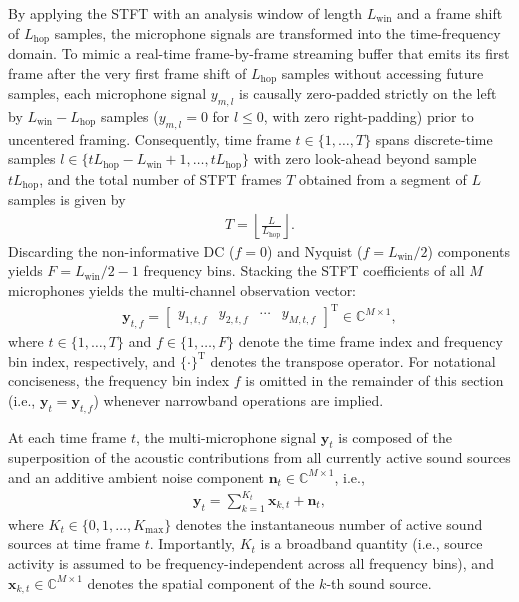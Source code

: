 \documentclass[lettersize,journal]{IEEEtran}
\begin{document}
By applying the \gls{STFT} with an analysis window of length $L_{\mathrm{win}}$ and a frame shift of $L_{\mathrm{hop}}$ samples, the microphone signals are transformed into the time-frequency domain. To mimic a real-time frame-by-frame streaming buffer that emits its first frame after the very first frame shift of $L_{\mathrm{hop}}$ samples without accessing future samples, each microphone signal $y_{m,l}$ is causally zero-padded strictly on the left by $L_{\mathrm{win}} - L_{\mathrm{hop}}$ samples ($y_{m,l} = 0$ for $l \le 0$, with zero right-padding) prior to uncentered framing. Consequently, time frame $t \in \{1, \ldots, T\}$ spans discrete-time samples $l \in \{t L_{\mathrm{hop}} - L_{\mathrm{win}} + 1, \ldots, t L_{\mathrm{hop}}\}$ with zero look-ahead beyond sample $t L_{\mathrm{hop}}$, and the total number of \gls{STFT} frames $T$ obtained from a segment of $L$ samples is given by
\begin{align}
  T = \left\lfloor \frac{L}{L_{\mathrm{hop}}} \right\rfloor.
  \label{eq:num_frames_def}
\end{align}
Discarding the non-informative DC ($f=0$) and Nyquist ($f=L_{\mathrm{win}}/2$) components yields $F = L_{\mathrm{win}}/2 - 1$ frequency bins. Stacking the \gls{STFT} coefficients of all $M$ microphones yields the multi-channel observation vector:
\begin{align}
  \mathbf{y}_{t,f} = \begin{bmatrix} y_{1,t,f} & y_{2,t,f} & \cdots & y_{M,t,f} \end{bmatrix}^{\mathrm{T}} \in \mathbb{C}^{M\times 1},
  \label{eq:sig_vec_def}
\end{align}
where $t \in \{1, \ldots, T\}$ and $f \in \{1, \ldots, F\}$ denote the time frame index and frequency bin index, respectively, and $\{\cdot\}^{\mathrm{T}}$ denotes the transpose operator. For notational conciseness, the frequency bin index $f$ is omitted in the remainder of this section (i.e., $\mathbf{y}_t = \mathbf{y}_{t,f}$) whenever narrowband operations are implied.

At each time frame $t$, the multi-microphone signal $\mathbf{y}_t$ is composed of the superposition of the acoustic contributions from all currently active sound sources and an additive ambient noise component $\mathbf{n}_t \in \mathbb{C}^{M\times 1}$, i.e.,
\begin{align}
  \mathbf{y}_t = \sum_{k=1}^{K_t} \mathbf{x}_{k,t} + \mathbf{n}_t,
  \label{eq:acoustic_mixture_model}
\end{align}
where $K_t \in \{0, 1, \ldots, K_{\mathrm{max}}\}$ denotes the instantaneous number of active sound sources at time frame $t$. Importantly, $K_t$ is a broadband quantity (i.e., source activity is assumed to be frequency-independent across all frequency bins), and $\mathbf{x}_{k,t} \in \mathbb{C}^{M\times 1}$ denotes the spatial component of the $k$-th sound source.
\end{document}
